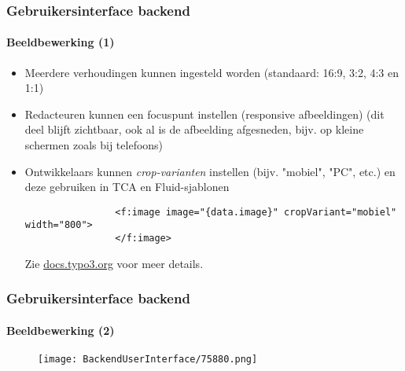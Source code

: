 \begin{frame}[fragile]
	\frametitle{Gebruikersinterface backend}
	\framesubtitle{Beeldbewerking (1)}

	\begin{itemize}

		\item Meerdere verhoudingen kunnen ingesteld worden\newline
			\small(standaard: 16:9, 3:2, 4:3 en 1:1)\normalsize

		\item Redacteuren kunnen een focuspunt instellen (responsive afbeeldingen)\newline
			\small
				(dit deel blijft zichtbaar, ook al is de afbeelding afgesneden,
				bijv. op kleine schermen zoals bij telefoons)
			\normalsize

		\item Ontwikkelaars kunnen \textit{crop-varianten} instellen (bijv. "mobiel",
		 	"PC", etc.) en deze gebruiken in TCA en Fluid-sjablonen

			\begin{lstlisting}
				<f:image image="{data.image}" cropVariant="mobiel" width="800">
				</f:image>
			\end{lstlisting}

			Zie \href{https://docs.typo3.org/typo3cms/extensions/core/8-dev/Changelog/8.6/Feature-75880-ImplementMultipleCroppingVariantsInImageManipulationTool.html}{docs.typo3.org}
			voor meer details.

	\end{itemize}

\end{frame}

\begin{frame}[fragile]
	\frametitle{Gebruikersinterface backend}
	\framesubtitle{Beeldbewerking (2)}

	\begin{figure}\vspace*{-0.6cm}
		\texttt{[image: BackendUserInterface/75880.png]}
	\end{figure}

\end{frame}


